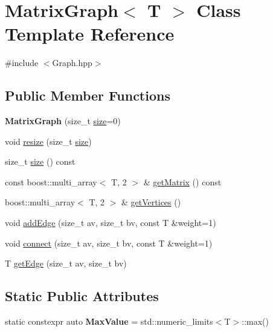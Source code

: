 \hypertarget{class_matrix_graph}{}\section{Matrix\+Graph$<$ T $>$ Class Template Reference}
\label{class_matrix_graph}


{\ttfamily \#include $<$Graph.\+hpp$>$}

\subsection*{Public Member Functions}
\begin{DoxyCompactItemize}
\item 
\mbox{\label{class_matrix_graph_af29d807007dbccc14567f5ee60c6b4eb}} 
{\bfseries Matrix\+Graph} (size\+\_\+t \hyperlink{class_matrix_graph_acb1c06541182d4bb472c9813942a75b0}{size}=0)
\item 
void \hyperlink{class_matrix_graph_acc5d5c603987bc7a00fc11d37f1edd83}{resize} (size\+\_\+t \hyperlink{class_matrix_graph_acb1c06541182d4bb472c9813942a75b0}{size})
\item 
size\+\_\+t \hyperlink{class_matrix_graph_acb1c06541182d4bb472c9813942a75b0}{size} () const
\item 
const boost\+::multi\+\_\+array$<$ T, 2 $>$ \& \hyperlink{class_matrix_graph_ae6b799585fda6e65cb2fa6693cc8603e}{get\+Matrix} () const
\item 
boost\+::multi\+\_\+array$<$ T, 2 $>$ \& \hyperlink{class_matrix_graph_a4775ce045cd24d6ec81755fc571700ea}{get\+Vertices} ()
\item 
void \hyperlink{class_matrix_graph_af4d5e646d3bc3618b83c94610108e089}{add\+Edge} (size\+\_\+t av, size\+\_\+t bv, const T \&weight=1)
\item 
void \hyperlink{class_matrix_graph_a32ed83475da8b8d144bfc3335ae33df0}{connect} (size\+\_\+t av, size\+\_\+t bv, const T \&weight=1)
\item 
T \hyperlink{class_matrix_graph_af1e22d0a92d5475011c0073e84c2c254}{get\+Edge} (size\+\_\+t av, size\+\_\+t bv)
\end{DoxyCompactItemize}
\subsection*{Static Public Attributes}
\begin{DoxyCompactItemize}
\item 
\mbox{\label{class_matrix_graph_ab6d0f5b70345a14bf8a00c293fc78c9d}} 
static constexpr auto {\bfseries Max\+Value} = std\+::numeric\+\_\+limits$<$T$>$\+::max()
\end{DoxyCompactItemize}



